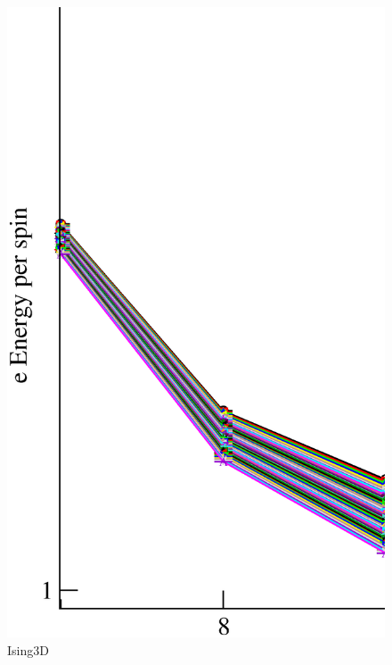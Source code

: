 \begin{figure}[!htpb]
  \centering
  \includegraphics[width=15cm]{./plots/Ising3D/Ising3D_Energy_vs_L.eps}
  \caption{Ising3D}
\end{figure}

